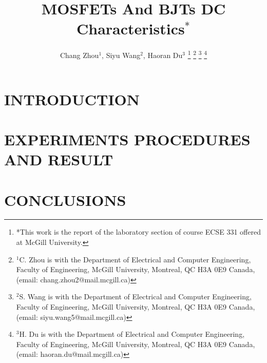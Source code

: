 \documentclass[letterpaper, 10 pt, conference]{ieeeconf}  %
\title{\Huge MOSFETs And BJTs DC Characteristics$^{*}$}
\author{Chang Zhou$^{1}$, Siyu Wang$^{2}$, Haoran Du$^{3}$%
\thanks{*This work is the report of the laboratory section of course ECSE 331 offered at McGill University.}%
\thanks{$^{1}$C. Zhou is with the Department of Electrical and Computer
Engineering, Faculty of Engineering, McGill University, Montreal, QC H3A 0E9 Canada,
(email: chang.zhou2@mail.mcgill.ca)}%
\thanks{$^{2}$S. Wang is with the Department of Electrical and Computer
Engineering, Faculty of Engineering, McGill University, Montreal, QC H3A 0E9 Canada,
(email: siyu.wang5@mail.mcgill.ca)}%
\thanks{$^{3}$H. Du is with the Department of Electrical and Computer
Engineering, Faculty of Engineering, McGill University, Montreal, QC H3A 0E9 Canada,
(email: haoran.du@mail.mcgill.ca)}%
}
\begin{document}

\maketitle
\thispagestyle{fancy}
\pagestyle{fancy}
\setcounter{page}{1}
\fancyhf{} %
\renewcommand{\headrulewidth}{0pt} %
\rhead{\thepage}

\begin{abstract}

\end{abstract}

\section{INTRODUCTION}

\section{EXPERIMENTS PROCEDURES AND RESULT}

\section{CONCLUSIONS}
\end{document}
